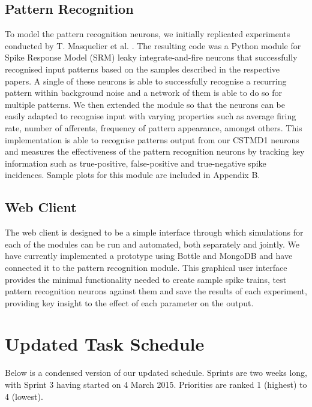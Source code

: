 \documentclass[a4paper,11pt]{article}
\begin{document}
\subsection{Pattern Recognition}
To model the pattern recognition neurons, we initially replicated experiments conducted by T. Masquelier et al. \cite{stdp2} \cite{stdp1} . The resulting code was a Python module for Spike Response Model (SRM) leaky integrate-and-fire neurons that successfully recognised input patterns based on the samples described in the respective papers. A single of these neurons is able to successfully recognise a recurring pattern within background noise and a network of them is able to do so for multiple patterns. We then extended the module so that the neurons can be easily adapted to recognise input with varying properties such as average firing rate, number of afferents, frequency of pattern appearance, amongst others. This implementation is able to recognise patterns output from our CSTMD1 neurons and measures the effectiveness of the pattern recognition neurons by tracking key information such as true-positive, false-positive and true-negative spike incidences. Sample plots for this module are included in Appendix B.

\subsection{Web Client}
The web client is designed to be a simple interface through which simulations for each of the modules can be run and automated, both separately and jointly. We have currently implemented a prototype using Bottle and MongoDB and have connected it to the pattern recognition module. This graphical user interface provides the minimal functionality needed to create sample spike trains, test pattern recognition neurons against them and save the results of each experiment, providing key insight to the effect of each parameter on the output.


\section{Updated Task Schedule}	

Below is a condensed version of our updated schedule. Sprints are two weeks long, with Sprint 3 having started on 4 March 2015. Priorities are ranked 1 (highest) to 4 (lowest). 
\end{document}
